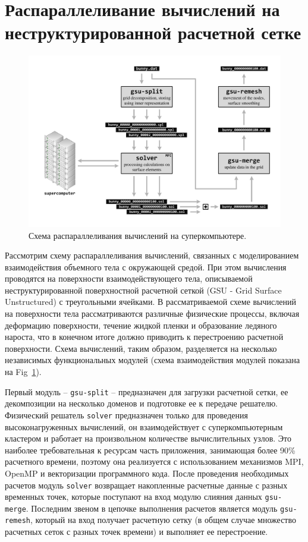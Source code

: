 \documentclass[
11pt,%
tightenlines,%
twoside,%
onecolumn,%
nofloats,%
nobibnotes,%
nofootinbib,%
superscriptaddress,%
noshowpacs,%
centertags]%
{revtex4}
\begin{document}
\section{Распараллеливание вычислений на неструктурированной расчетной сетке}

\begin{figure}[h]
\includegraphics[width=1.0\textwidth]{pics/02-scheme.pdf}
\caption{Схема распараллеливания вычислений на суперкомпьютере.}\label{fig:02-scheme}
\end{figure}

Рассмотрим схему распараллеливания вычислений, связанных с моделированием взаимодействия объемного тела с окружающей средой.
При этом вычисления проводятся на поверхности взаимодействующего тела, описываемой неструктурированной поверхностной расчетной сеткой (GSU - Grid Surface Unstructured) с треугольными ячейками.
В рассматриваемой схеме вычислений на поверхности тела рассматриваются различные физические процессы, включая деформацию поверхности, течение жидкой пленки и образование ледяного нароста, что в конечном итоге должно приводить к перестроению расчетной поверхности.
Схема вычислений, таким образом, разделяется на несколько независимых функциональных модулей (схема взаимодействия модулей показана на Fig~\ref{fig:02-scheme}).

Первый модуль -- \texttt{gsu-split} -- предназначен для загрузки расчетной сетки, ее декомпозиции на несколько доменов и подготовке ее к передаче решателю.
Физический решатель \texttt{solver} предназначен только для проведения высоконагруженных вычислений, он взаимодействует с суперкомпьютерным кластером и работает на произвольном количестве вычислительных узлов.
Это наиболее требовательная к ресурсам часть приложения, занимающая более 90\% расчетного времени, поэтому она реализуется с использованием механизмов MPI, OpenMP и векторизации программного кода.
После проведения необходимых расчетов модуль \texttt{solver} возвращает накопленные расчетные данные с разных временных точек, которые поступают на вход модулю слияния данных \texttt{gsu-merge}.
Последним звеном в цепочке выполнения расчетов является модуль \texttt{gsu-remesh}, который на вход получает расчетную сетку (в общем случае множество расчетных сеток с разных точек времени) и выполняет ее перестроение. 
\end{document}
